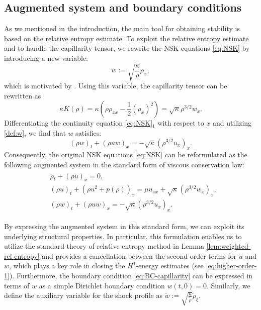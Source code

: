 \documentclass[11pt,reqno]{amsart}
\numberwithin{equation}{section} %
\begin{document}
\subsection{Augmented system and boundary conditions}
As we mentioned in the introduction, the main tool for obtaining stability is based on the relative entropy estimate. To exploit the relative entropy estimate and to handle the capillarity tensor, we rewrite the NSK equations \eqref{eq:NSK} by introducing a new variable:
\begin{equation}\label{def:w}
    w := \sqrt{\frac{\kappa}{\rho}} \rho_x,
\end{equation}
which is motivated by \cite{BDD06,HKKL25-JDE}. Using this variable, the capillarity tensor can be rewritten as
\[
    \kappa K(\rho) = \kappa\left(\rho\rho_{xx} - \frac{1}{2}(\rho_x)^2\right) = \sqrt{\kappa} \rho^{3/2}w_x.
\]
Differentiating the continuity equation \eqref{eq:NSK}$_1$ with respect to $x$ and utilizing \eqref{def:w}, we find that $w$ satisfies:
\[
    (\rho w)_t + (\rho u w)_x = -\sqrt{\kappa} (\rho^{3/2}u_x)_x.
\]
Consequently, the original NSK equations \eqref{eq:NSK} can be reformulated as the following augmented system in the standard form of viscous conservation law:
\begin{align}\label{eq:augmented-sys}
\begin{aligned}
    &\rho_t + (\rho u)_x = 0, \\
    &(\rho u)_t + (\rho u^2 + p(\rho))_x =\mu u_{xx} + \sqrt{\kappa} (\rho^{3/2} w_x)_x, \\
    &(\rho w)_t + (\rho u w)_x = -\sqrt{\kappa} (\rho^{3/2} u_x)_x.
\end{aligned}
\end{align}

By expressing the augmented system in this standard form, we can exploit its underlying structural properties. In particular, this formulation enables us to utilize the standard theory of relative entropy method in Lemma \ref{lem:weighted-rel-entropy} and provides a cancellation between the second-order terms for $u$ and $w$, which plays a key role in closing the $H^1$-energy estimates (see \eqref{eq:higher-order-1}). Furthermore, the boundary condition \eqref{eq:BC-capillarity} can be expressed in terms of $w$ as a simple Dirichlet boundary condition $w(t,0)=0$. Similarly, we define the auxiliary variable for the shock profile as $\tilde{w}:=\sqrt{\frac{\kappa}{\tilde{\rho}}}\tilde{\rho}_\xi$.
\end{document}
